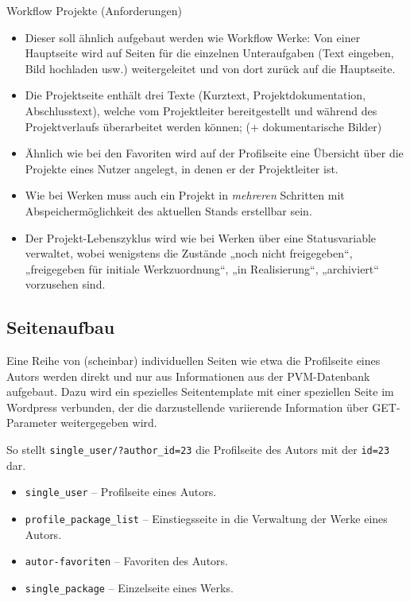 \documentclass[a4paper,11pt]{article}
\begin{document}
Workflow Projekte (Anforderungen)
\begin{itemize}\itemsep0pt
\item Dieser soll ähnlich aufgebaut werden wie Workflow Werke: Von einer
  Hauptseite wird auf Seiten für die einzelnen Unteraufgaben (Text eingeben,
  Bild hochladen usw.) weitergeleitet und von dort zurück auf die Hauptseite.
\item Die Projektseite enthält drei Texte (Kurztext, Projektdokumentation,
  Abschlusstext), welche vom Projektleiter bereitgestellt und während des
  Projektverlaufs überarbeitet werden können; (+ dokumentarische Bilder)
\item Ähnlich wie bei den Favoriten wird auf der Profilseite eine Übersicht
  über die Projekte eines Nutzer angelegt, in denen er der Projektleiter ist.
\item Wie bei Werken muss auch ein Projekt in \emph{mehreren} Schritten mit
  Abspeicher\-möglichkeit des aktuellen Stands erstellbar sein.
\item Der Projekt-Lebenszyklus wird wie bei Werken über eine Statusvariable
  verwaltet, wobei wenigstens die Zustände „noch nicht freigegeben“,
  „freigegeben für initiale Werkzuordnung“, „in Realisierung“, „archiviert“
  vorzusehen sind.
\end{itemize}

\subsection{Seitenaufbau}

Eine Reihe von (scheinbar) individuellen Seiten wie etwa die Profilseite eines
Autors werden direkt und nur aus Informationen aus der PVM-Datenbank
aufgebaut.  Dazu wird ein spezielles Seitentemplate mit einer speziellen Seite
im Wordpress verbunden, der die darzustellende variierende Information über
GET-Parameter weitergegeben wird.  

So stellt \texttt{single\_user/?author\_id=23} die Profilseite des Autors mit
der \texttt{id=23} dar.

\begin{itemize} \itemsep0pt
\item \texttt{single\_user} -- Profilseite eines Autors.
\item \texttt{profile\_package\_list} -- Einstiegsseite in die Verwaltung der
  Werke eines Autors.
\item \texttt{autor-favoriten} -- Favoriten des Autors.
\item \texttt{single\_package} -- Einzelseite eines Werks.
\end{itemize}
\end{document}
